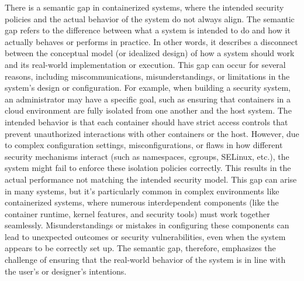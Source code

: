 There is a semantic gap in containerized systems, where the intended security policies and the actual behavior of the system do not always align. The semantic gap refers to the difference between what a system is intended to do and how it actually behaves or performs in practice. In other words, it describes a disconnect between the conceptual model (or idealized design) of how a system should work and its real-world implementation or execution. This gap can occur for several reasons, including miscommunications, misunderstandings, or limitations in the system's design or configuration. For example, when building a security system, an administrator may have a specific goal, such as ensuring that containers in a cloud environment are fully isolated from one another and the host system. The intended behavior is that each container should have strict access controls that prevent unauthorized interactions with other containers or the host. However, due to complex configuration settings, misconfigurations, or flaws in how different security mechanisms interact (such as namespaces, cgroups, SELinux, etc.), the system might fail to enforce these isolation policies correctly. This results in the actual performance not matching the intended security model. This gap can arise in many systems, but it's particularly common in complex environments like containerized systems, where numerous interdependent components (like the container runtime, kernel features, and security tools) must work together seamlessly. Misunderstandings or mistakes in configuring these components can lead to unexpected outcomes or security vulnerabilities, even when the system appears to be correctly set up. The semantic gap, therefore, emphasizes the challenge of ensuring that the real-world behavior of the system is in line with the user's or designer's intentions.

